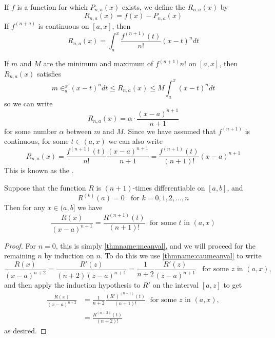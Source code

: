 \documentclass[12pt, a4paper, oneside, openright, titlepage]{book}
\begin{document}
\begin{defn}
    If $f$ is a function for which $P_{n,a}(x)$ exists, we define the  $R_{n,a}(x)$ by \begin{equation*}
        R_{n,a}(x) = f(x) - P_{n,a}(x)
    \end{equation*}
    If $f^{(n+a)}$ is continuous on $[a,x]$, then \begin{equation*}
        R_{n,a}(x) = \int_a^x\frac{f^{(n+1)}(t)}{n!}(x-t)^ndt
    \end{equation*}
\end{defn}

\begin{rmk}
    If $m$ and $M$ are the minimum and maximum of $f^{(n+1)}{n!}$ on $[a,x]$, then $R_{n,a}(x)$ satisfies \begin{equation*}
        m\in_a^x(x-t)^ndt\leq R_{n,a}(x)\leq M\int_a^x(x-t)^ndt
    \end{equation*}
    so we can write \begin{equation*}
        R_{n,a}(x) = \alpha\cdot \frac{(x-a)^{n+1}}{n+1}
    \end{equation*}
    for some number $\alpha$ between $m$ and $M$. Since we have assumed that $f^{(n+1)}$ is continuous, for some $t \in (a,x)$ we can also write \begin{equation*}
        R_{n,a}(x) = \frac{f^{(n+1)}(t)}{n!}\frac{(x-a)^{n+1}}{n+1} = \frac{f^{(n+1)}(t)}{(n+1)!}(x-a)^{n+1}
    \end{equation*}
    This is known as the .
\end{rmk}


\begin{lem}
    Suppose that the function $R$ is $(n+1)$-times differentiable on $[a,b]$, and \begin{equation*}
        R^{(k)}(a) = 0\;\;\text{ for } k =0,1,2,...,n
    \end{equation*}
    Then for any $x \in (a,b]$ we have \begin{equation*}
        \frac{R(x)}{(x-a)^{n+1}} = \frac{R^{(n+1)}(t)}{(n+1)!}\;\text{ for some $t$ in } (a,x)
    \end{equation*}
\end{lem}
\begin{proof}
    For $n = 0$, this is simply \ref{thmname:meanval}, and we will proceed for the remaining $n$ by induction on $n$. To do this we use \ref{thmname:caumeanval} to write \begin{equation*}
        \frac{R(x)}{(x-a)^{n+2}} = \frac{R'(z)}{(n+2)(z-a)^{n+1}} = \frac{1}{n+2}\frac{R'(z)}{(z-a)^{n+1}}\;\;\text{ for some $z$ in } (a,x),
    \end{equation*}
    and then apply the induction hypothesis to $R'$ on the interval $[a,z]$ to get \begin{align*}
        \frac{R(x)}{(x-a)^{n+2}} &= \frac{1}{n+2}\frac{(R')^{(n+1)}(t)}{(n+1)!}\;\text{ for some $z$ in } (a,x), \\
        &= \frac{R^{(n+2)}(t)}{(n+2)!}
    \end{align*}
    as desired.
\end{proof}
\end{document}
